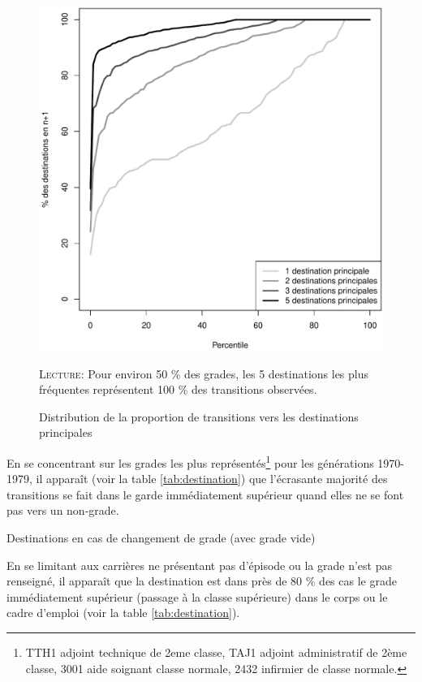 \documentclass[11pt,a4paper]{article}
\begin{document}
\begin{figure}[t]
  \label{pct}
\caption{Distribution de la proportion de transitions vers les destinations principales}
\vspace{-0.1cm}
\centering
 \includegraphics[width=0.7\linewidth]{pct.pdf}
\vspace{0.1cm}  
\begin{minipage}{12cm}%
\small \textsc{Lecture:} Pour environ 50 \% des grades, les 5 destinations les plus fréquentes représentent 100 \% des transitions observées.  
 \end{minipage}%
\end{figure}

En se concentrant sur les grades les plus représentés\footnote{TTH1 adjoint technique de 2eme classe, TAJ1 adjoint administratif de 2ème classe, 3001 aide soignant classe normale, 2432 infirmier de classe normale.}
pour les générations 1970-1979, il apparaît (voir la table \ref{tab:destination}) que l'écrasante majorité des transitions se fait dans le garde immédiatement supérieur quand elles ne se font pas vers un non-grade.
\begin{table}[htbp]
    \label{tab:destination}
    \centering
    \caption{Destinations en cas de changement de grade (avec grade vide)} 
    
\end{table}

En se limitant aux carrières ne présentant pas d'épisode ou la grade n'est pas renseigné, il apparaît que la destination est dans près de 80 \% des cas le grade immédiatement supérieur (passage à la classe supérieure) dans le corps ou le cadre d'emploi (voir la table \ref{tab:destination}).       
\end{document}
